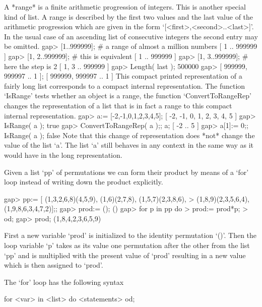 A *range* is a finite arithmetic progression of integers. This is another
special kind of list. A range is described by the first two values and the last
value of the arithmetic progression which are given in the form
`[<first>,<second>..<last>]'.
In the usual case of an ascending list of
consecutive integers the second entry may be omitted.
\beginexample
gap> [1..999999];     #  a range of almost a million numbers
[ 1 .. 999999 ]
gap> [1, 2..999999];  #  this is equivalent
[ 1 .. 999999 ]
gap> [1, 3..999999];  #  here the step is 2
[ 1, 3 .. 999999 ]
gap> Length( last );
500000
gap> [ 999999, 999997 .. 1 ];
[ 999999, 999997 .. 1 ]
\endexample
This compact printed representation of a fairly long  list corresponds to
a  compact internal representation.
The function `IsRange' tests whether an object is a range,
the function `ConvertToRangeRep' changes the representation of a list
that is in fact a range to this compact internal representation.
\beginexample
gap> a:= [-2,-1,0,1,2,3,4,5];
[ -2, -1, 0, 1, 2, 3, 4, 5 ]
gap> IsRange( a );
true
gap> ConvertToRangeRep( a );;  a;
[ -2 .. 5 ]
gap> a[1]:= 0;; IsRange( a );
false
\endexample
Note that this  change of representation does  *not* change the  value of
the list `a'. The list `a'  still behaves in any context  in the same way
as it would have in the long representation.



%

Given a list `pp' of permutations we can form their product by means of a
`for' loop instead of writing down the product explicitly.

\beginexample
gap> pp:= [ (1,3,2,6,8)(4,5,9), (1,6)(2,7,8), (1,5,7)(2,3,8,6),
>           (1,8,9)(2,3,5,6,4), (1,9,8,6,3,4,7,2)];;
gap> prod:= ();        
()
gap> for p in pp do
>       prod:= prod*p;    
>    od;
gap> prod;        
(1,8,4,2,3,6,5,9)
\endexample

First a  new variable `prod'  is initialized  to the identity permutation
`()'. Then the loop variable `p' takes as its value one permutation after
the other from the list `pp' and is multiplied with  the present value of
`prod'  resulting in a  new value which  is then assigned  to `prod'.

The `for' loop has the following syntax

\)\fmark for <var> in <list> do <statements> od;

